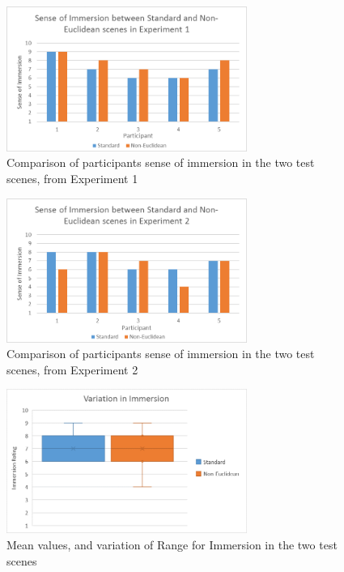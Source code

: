 			\begin{figure}[H]
				\includegraphics[width=0.7\textwidth]{Images/Compare_Immersion_Exp_1}
				\centering
				\caption{Comparison of participants sense of immersion in the two test scenes, from Experiment 1}
				\label{exp:fig:compare_immersion_exp1}
			\end{figure}

			\begin{figure}[H]
				\includegraphics[width=0.7\textwidth]{Images/Compare_Immersion_Exp_2}
				\centering
				\caption{Comparison of participants sense of immersion in the two test scenes, from Experiment 2}
				\label{exp:fig:compare_immersion_exp2}
			\end{figure}

			\begin{figure}[H]
				\includegraphics[width=0.7\textwidth]{Images/Compare_Immersion_Variation}
				\centering
				\caption{Mean values, and variation of Range for Immersion in the two test scenes}
				\label{exp:fig:compare_immersion_variation}
			\end{figure}

